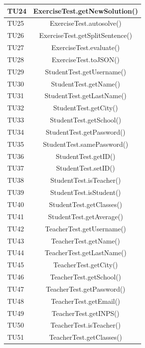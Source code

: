\begin{longtable}{|>{\centering\arraybackslash}m{1.6cm}|c|}
		\rowcolor{LightGray}
		TU24 & ExerciseTest.getNewSolution()\\ \hline
		TU25 & ExerciseTest.autosolve()\\ \hline
		\rowcolor{LightGray}
		TU26 & ExerciseTest.getSplitSentence()\\ \hline
		TU27 & ExerciseTest.evaluate()\\ \hline
		\rowcolor{LightGray}
		TU28 & ExerciseTest.toJSON()\\ \hline
		TU29 & StudentTest.getUsername() \\ \hline
		\rowcolor{LightGray}
		TU30 & StudentTest.getName()\\ \hline
		TU31 & StudentTest.getLastName() \\ \hline
		\rowcolor{LightGray}
		TU32 & StudentTest.getCity() \\ \hline
		TU33 & StudentTest.getSchool() \\ \hline
		\rowcolor{LightGray}
		TU34 & StudentTest.getPassword() \\ \hline
		TU35 & StudentTest.samePassword()\\ \hline
		\rowcolor{LightGray}
		TU36 & StudentTest.getID()\\ \hline
		TU37 & StudentTest.setID()\\ \hline
		\rowcolor{LightGray}
		TU38 & StudentTest.isTeacher() \\ \hline
		TU39 & StudentTest.isStudent() \\ \hline
		\rowcolor{LightGray}
		TU40 & StudentTest.getClasses() \\ \hline
		TU41 & StudentTest.getAverage()\\ \hline
		\rowcolor{LightGray}
		TU42 & TeacherTest.getUsername()\\ \hline
		TU43 & TeacherTest.getName() \\ \hline
		\rowcolor{LightGray}
		TU44 & TeacherTest.getLastName() \\ \hline
		TU45 & TeacherTest.getCity() \\ \hline
		\rowcolor{LightGray}
		TU46 & TeacherTest.getSchool() \\ \hline
		TU47 & TeacherTest.getPassword() \\ \hline
		\rowcolor{LightGray}
		TU48 & TeacherTest.getEmail() \\ \hline
		TU49 & TeacherTest.getINPS()\\ \hline
		\rowcolor{LightGray}
		TU50 & TeacherTest.isTeacher() \\ \hline
		TU51 & TeacherTest.getClasses() \\ \hline

\end{longtable}

